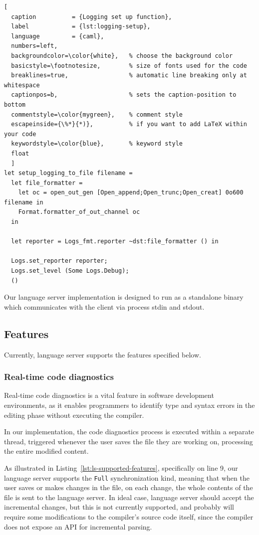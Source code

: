 \begin{lstlisting}[
  caption          = {Logging set up function}, 
  label            = {lst:logging-setup},
  language         = {caml},
  numbers=left,
  backgroundcolor=\color{white},   % choose the background color
  basicstyle=\footnotesize,        % size of fonts used for the code
  breaklines=true,                 % automatic line breaking only at whitespace
  captionpos=b,                    % sets the caption-position to bottom
  commentstyle=\color{mygreen},    % comment style
  escapeinside={\%*}{*)},          % if you want to add LaTeX within your code
  keywordstyle=\color{blue},       % keyword style
  float
  ]
let setup_logging_to_file filename =
  let file_formatter = 
    let oc = open_out_gen [Open_append;Open_trunc;Open_creat] 0o600 filename in
    Format.formatter_of_out_channel oc
  in
  
  let reporter = Logs_fmt.reporter ~dst:file_formatter () in
  
  Logs.set_reporter reporter;
  Logs.set_level (Some Logs.Debug);
  ()
\end{lstlisting}

Our language server implementation is designed to run as a standalone binary 
which communicates with the client via process stdin and stdout.

\subsection{Features}

Currently, language server supports the features specified below.

\subsubsection*{Real-time code diagnostics}


\label{impl:code-diagnostics}

Real-time code diagnostics is a vital feature in software development
environments, as it enables programmers to identify type and syntax errors in
the editing phase without executing the compiler. 

In our implementation, the code diagnostics process is executed within a
separate thread, triggered whenever the user saves the file they are working on,
processing the entire modified content. 

As illustrated in Listing~\ref{lst:ls-supported-features}, specifically on line
9, our language server supports the \texttt{Full} synchronization kind, meaning
that when the user saves or makes changes in the file, on each change, the whole
contents of the file is sent to the language server. In ideal case, language
server should accept the incremental changes, but this is not currently
supported, and probably will require some modifications to the compiler's source
code itself, since the compiler does not expose an API for incremental parsing.


